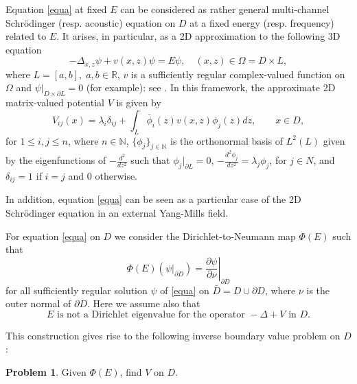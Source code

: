 \documentclass[11pt,a4paper,english,subeqn]{amsart}
\theoremstyle{plain}
\theoremstyle{definition}
\newtheorem{prob}{Problem}
\numberwithin{equation}{section}
\begin{document}
Equation \eqref{equa} at fixed $E$ can be considered as rather general multi-channel Schr\"odinger (resp. acoustic) equation on $D$ at a fixed energy (resp. frequency) related to $E$. It arises, in particular, as a 2D approximation to the following 3D equation
\begin{equation} \label{3dequa}
-\Delta_{x,z} \psi + v(x,z)\psi = E \psi, \quad (x,z) \in \Omega = D \times L,
\end{equation}
where $L = [a,b],\; a,b \in {\mathbb{R}}$, $v$ is a sufficiently regular complex-valued function on $\Omega$ and $\psi|_{D \times \partial L} = 0$ (for example): see \cite[Sec. 2]{NS2}. In this framework, the approximate 2D matrix-valued potential $V$ is given by
\begin{equation} \label{back}
V_{ij}(x) = \lambda_i \delta_{ij} + \int_L \bar \phi_i(z) v(x,z) \phi_j(z) dz, \qquad x \in D,
\end{equation}
for $1 \leq i,j \leq n$, where $n \in {\mathbb{N}}$, $\{ \phi_j \}_{j \in {\mathbb{N}}}$ is the orthonormal basis of $L^2(L)$ given by the eigenfunctions of $- \frac{d^2}{dz^2}$ such that $\phi_j|_{\partial L} = 0$, $-\frac{d^2 \phi_j}{d z^2}= \lambda_j \phi_j$, for $j \in N$, and $\delta_{ij} = 1$ if $i = j$ and $0$ otherwise.

In addition, equation \eqref{equa} can be seen as a particular case of the 2D Schr\"odinger equation in an external Yang-Mills field.\smallskip

For equation \eqref{equa} on $D$ we consider the Dirichlet-to-Neumann map $\Phi(E)$ such that
\begin{equation} \label{defphi}
\Phi(E)(\psi|_{\partial D}) = \left.\frac{\partial \psi}{\partial \nu}\right|_{\partial D}
\end{equation}
for all sufficiently regular solution $\psi$ of \eqref{equa} on $\bar D = D \cup \partial D$, where $\nu$ is the outer normal of $\partial D$.
Here we assume also that
\begin{equation} \label{direig}
E \textrm{ is not a Dirichlet eigenvalue for the operator } - \Delta + V \textrm{ in } D.
\end{equation}

This construction gives rise to the following inverse boundary value problem on $D$:

\begin{prob} \label{pro1}
Given $\Phi(E)$, find $V$ on $D$.
\end{prob}
\end{document}
